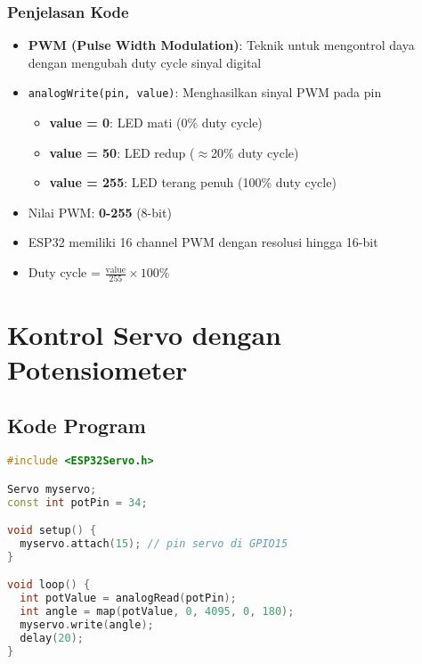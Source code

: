 \documentclass[12pt,a4paper]{article}
\begin{document}
\subsubsection{Penjelasan Kode}
\begin{itemize}
    \item \textbf{PWM (Pulse Width Modulation)}: Teknik untuk mengontrol daya dengan mengubah duty cycle sinyal digital
    \item \texttt{analogWrite(pin, value)}: Menghasilkan sinyal PWM pada pin
    \begin{itemize}
        \item \textbf{value = 0}: LED mati (0\% duty cycle)
        \item \textbf{value = 50}: LED redup ($\approx$20\% duty cycle)
        \item \textbf{value = 255}: LED terang penuh (100\% duty cycle)
    \end{itemize}
    \item Nilai PWM: \textbf{0-255} (8-bit)
    \item ESP32 memiliki 16 channel PWM dengan resolusi hingga 16-bit
    \item Duty cycle = $\frac{\text{value}}{255} \times 100\%$
\end{itemize}

\newpage
\section{Kontrol Servo dengan Potensiometer}

\subsection{Kode Program}
\begin{lstlisting}[language=C++, caption={Kontrol Servo Berdasarkan Potensiometer}]
#include <ESP32Servo.h>

Servo myservo;
const int potPin = 34;

void setup() {
  myservo.attach(15); // pin servo di GPIO15
}

void loop() {
  int potValue = analogRead(potPin);
  int angle = map(potValue, 0, 4095, 0, 180);
  myservo.write(angle);
  delay(20);
}
\end{lstlisting}
\end{document}
